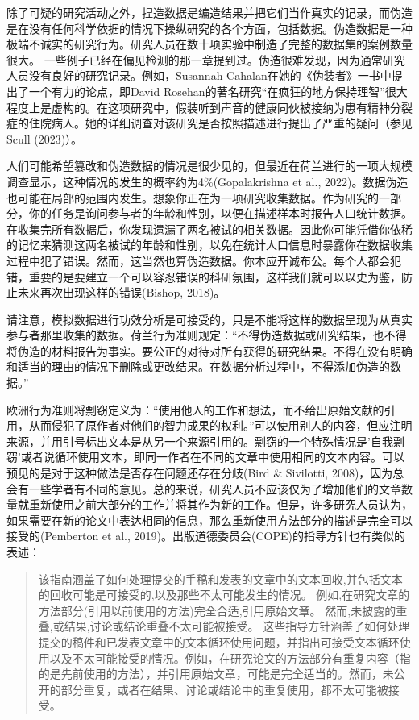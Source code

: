 \documentclass[
  letterpaper,
  DIV=11,
  numbers=noendperiod]{scrreprt}
\begin{document}
除了可疑的研究活动之外，捏造数据是编造结果并把它们当作真实的记录，而伪造是在没有任何科学依据的情况下操纵研究的各个方面，包括数据。伪造数据是一种极端不诚实的研究行为。研究人员在数十项实验中制造了完整的数据集的案例数量很大。
一些例子已经在偏见检测的那一章提到过。伪造很难发现，因为通常研究人员没有良好的研究记录。例如，Susannah
Cahalan在她的《伪装者》一书中提出了一个有力的论点，即David
Rosehan的著名研究``在疯狂的地方保持理智''很大程度上是虚构的。在这项研究中，假装听到声音的健康同伙被接纳为患有精神分裂症的住院病人。她的详细调查对该研究是否按照描述进行提出了严重的疑问（参见
Scull (2023)）。

人们可能希望篡改和伪造数据的情况是很少见的，但最近在荷兰进行的一项大规模调查显示，这种情况的发生的概率约为4\%(Gopalakrishna
et al.,
2022)。数据伪造也可能在局部的范围内发生。想象你正在为一项研究收集数据。作为研究的一部分，你的任务是询问参与者的年龄和性别，以便在描述样本时报告人口统计数据。在收集完所有数据后，你发现遗漏了两名被试的相关数据。因此你可能凭借你依稀的记忆来猜测这两名被试的年龄和性别，以免在统计人口信息时暴露你在数据收集过程中犯了错误。然而，这当然也算伪造数据。你本应开诚布公。每个人都会犯错，重要的是要建立一个可以容忍错误的科研氛围，这样我们就可以以史为鉴，防止未来再次出现这样的错误(Bishop,
2018)。

请注意，模拟数据进行功效分析是可接受的，只是不能将这样的数据呈现为从真实参与者那里收集的数据。荷兰行为准则规定：``不得伪造数据或研究结果，也不得将伪造的材料报告为事实。要公正的对待对所有获得的研究结果。不得在没有明确和适当的理由的情况下删除或更改结果。在数据分析过程中，不得添加伪造的数据。''

欧洲行为准则将剽窃定义为：``使用他人的工作和想法，而不给出原始文献的引用，从而侵犯了原作者对他们的智力成果的权利。''可以使用别人的内容，但应注明来源，并用引号标出文本是从另一个来源引用的。剽窃的一个特殊情况是'自我剽窃'或者说循环使用文本，即同一作者在不同的文章中使用相同的文本内容。可以预见的是对于这种做法是否存在问题还存在分歧(Bird
\& Sivilotti,
2008)，因为总会有一些学者有不同的意见。总的来说，研究人员不应该仅为了增加他们的文章数量就重新使用之前大部分的工作并将其作为新的工作。但是，许多研究人员认为，如果需要在新的论文中表达相同的信息，那么重新使用方法部分的描述是完全可以接受的(Pemberton
et al., 2019)。出版道德委员会(COPE)的指导方针也有类似的表述：

\begin{quote}
该指南涵盖了如何处理提交的手稿和发表的文章中的文本回收,并包括文本的回收可能是可接受的,以及那些不太可能发生的情况。
例如,在研究文章的方法部分(引用以前使用的方法)完全合适,引用原始文章。
然而,未披露的重叠,或结果,讨论或结论重叠不太可能被接受。
这些指导方针涵盖了如何处理提交的稿件和已发表文章中的文本循环使用问题，并指出可接受文本循环使用以及不太可能接受的情况。例如，在研究论文的方法部分有重复内容（指的是先前使用的方法），并引用原始文章，可能是完全适当的。然而，未公开的部分重复，或者在结果、讨论或结论中的重复使用，都不太可能被接受。
\end{quote}
\end{document}
